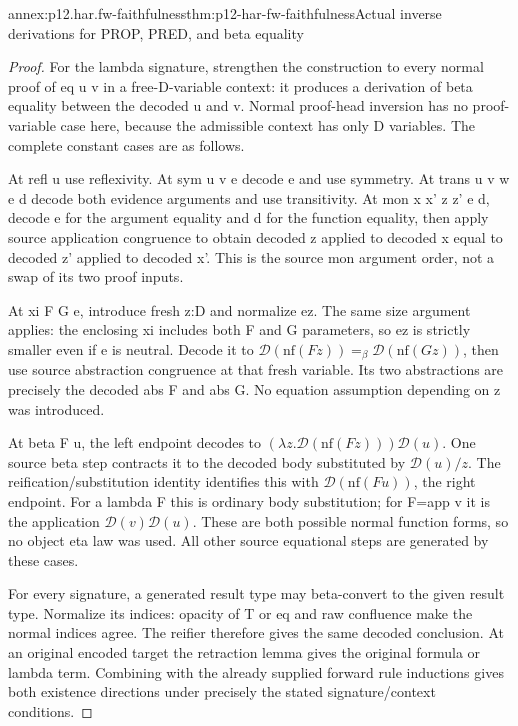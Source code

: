 \begin{annexitem}{annex:p12.har.fw-faithfulness}{thm:p12-har-fw-faithfulness}{Actual inverse derivations for PROP, PRED, and beta equality}
\begin{proof}
For the lambda signature, strengthen the construction to every normal
proof of eq u v in a free-D-variable context: it produces a derivation
of beta equality between the decoded u and v. Normal proof-head inversion
has no proof-variable case here, because the admissible context has only
D variables. The complete constant cases are as follows.

At refl u use reflexivity. At sym u v e decode e and use symmetry.
At trans u v w e d decode both evidence arguments and use transitivity.
At mon x x' z z' e d, decode e for the argument equality and d for
the function equality, then apply source application congruence to
obtain decoded z applied to decoded x equal to decoded z' applied
to decoded x'. This is the source mon argument order, not a swap of
its two proof inputs.

At xi F G e, introduce fresh z:D and normalize ez. The same size
argument applies: the enclosing xi includes both F and G parameters,
so ez is strictly smaller even if e is neutral. Decode it to
\(\mathcal D(\mathrm{nf}(Fz))=_\beta
\mathcal D(\mathrm{nf}(Gz))\), then use source abstraction congruence
at that fresh variable. Its two abstractions are precisely the decoded
abs F and abs G. No equation assumption depending on z was introduced.

At beta F u, the left endpoint decodes to
\((\lambda z.\mathcal D(\mathrm{nf}(Fz)))\mathcal D(u)\).
One source beta step contracts it to the decoded body substituted by
\(\mathcal D(u)/z\). The reification/substitution identity identifies
this with \(\mathcal D(\mathrm{nf}(Fu))\), the right endpoint.
For a lambda F this is ordinary body substitution; for F=app v it
is the application \(\mathcal D(v)\mathcal D(u)\). These are
both possible normal function forms, so no object eta law was used.
All other source equational steps are generated by these cases.

For every signature, a generated result type may beta-convert to the
given result type. Normalize its indices: opacity of T or eq and raw
confluence make the normal indices agree. The reifier therefore gives
the same decoded conclusion. At an original encoded target the
retraction lemma gives the original formula or lambda term. Combining
with the already supplied forward rule inductions gives both existence
directions under precisely the stated signature/context conditions.
\end{proof}
\end{annexitem}


